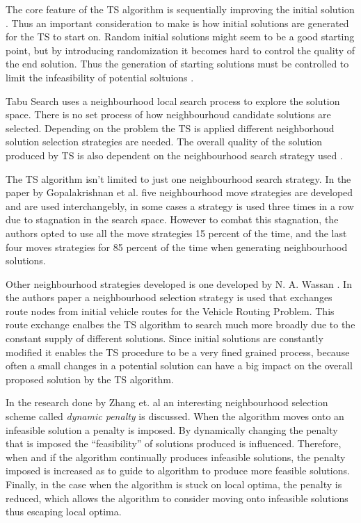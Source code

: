 The core feature of the TS algorithm is sequentially improving the initial solution \cite{TSHazardous}. Thus an important consideration to make is how initial solutions are generated for the TS to start on. Random initial solutions might seem to be a good starting point, but by introducing randomization it becomes hard to control the quality of the end solution. Thus the generation of starting solutions must be controlled to limit the infeasibility of potential soltuions \cite{TSHazardous}.

Tabu Search uses a neighbourhood local search process to explore the solution space. There is no set process of how neighbourhoud candidate solutions are selected. Depending on the problem the TS is applied different neighborhoud solution selection strategies are needed. The overall quality of the solution produced by TS is also dependent on the neighbourhood search strategy used \cite{TSHazardous}. 

The TS algorithm isn't limited to just one neighbourhood search strategy. In the paper by Gopalakrishnan et al.\cite{TabuCarryOver} five neighbourhood move strategies are developed and are used interchangebly, in some cases a strategy is used three times in a row due to stagnation in the search space. However to combat this stagnation, the authors opted to use all the move strategies 15 percent of the time, and the last four moves strategies for 85 percent of the time when generating neighbourhood solutions.

Other neighbourhood strategies developed is one developed by N. A. Wassan \cite{ReactiveTabuVHR}. In the authors paper a neighbourhood selection strategy is used that exchanges route nodes from initial vehicle routes for the Vehicle Routing Problem. This route exchange enalbes the TS algorithm to search much more broadly due to the constant supply of different solutions. Since initial solutions are constantly modified it enables the TS procedure to be a very fined grained process, because often a small changes in a potential solution can have a big impact on the overall proposed solution by the TS algorithm.

In the research done by Zhang et. al \cite{TSHazardous} an interesting neighbourhood selection scheme called \emph{dynamic penalty} is discussed. When the algorithm moves onto an infeasible solution a penalty is imposed. By dynamically changing the penalty that is imposed the ``feasibility'' of solutions produced is influenced. Therefore, when and if the algorithm continually produces infeasible solutions, the penalty imposed is increased as to guide to algorithm to produce more feasible solutions. Finally, in the case when the algorithm is stuck on local optima, the penalty is reduced, which allows the algorithm to consider moving onto infeasible solutions thus escaping local optima.

